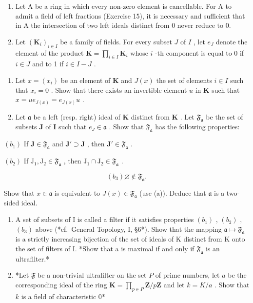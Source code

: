 \begin{enumerate}
\def\labelenumi{\arabic{enumi}.}
\setcounter{enumi}{15}
\item
  Let A be a ring in which every non-zero element is cancellable. For A to admit a field of left fractions (Exercise 15), it is necessary and sufficient that in A the intersection of two left ideals distinct from 0 never reduce to 0.
\item
  Let \((\mathbf{K}_i)_{i\in I}\) be a family of fields. For every subset \(J\) of \(I\) , let \(e_J\) denote the element of the product \(\mathbf{K} = \prod_{i\in I}\mathbf{K}_i\) whose \(i\) -th component is equal to 0 if \(i\in J\) and to 1 if \(i\in I - J\) .
\end{enumerate}

\begin{enumerate}
\def\labelenumi{(\alph{enumi})}
\item
  Let \(x = (x_{i})\) be an element of \(\mathbf{K}\) and \(J(x)\) the set of elements \(i \in I\) such that \(x_{i} = 0\) . Show that there exists an invertible element \(u\) in \(\mathbf{K}\) such that \(x = ue_{J(x)} = e_{J(x)}u\) .
\item
  Let \(\mathfrak{a}\) be a left (resp. right) ideal of \(\mathbf{K}\) distinct from \(\mathbf{K}\) . Let \(\mathfrak{F}_{\mathfrak{a}}\) be the set of subsets \(\mathbf{J}\) of \(\mathbf{I}\) such that \(e_{J} \in \mathfrak{a}\) . Show that \(\mathfrak{F}_{\mathfrak{a}}\) has the following properties:
\end{enumerate}

\((b_{1})\) If \(\mathbf{J} \in \mathfrak{F}_{\mathfrak{a}}\) and \(\mathbf{J}' \supset \mathbf{J}\) , then \(\mathbf{J}' \in \mathfrak{F}_{\mathfrak{a}}\) .

\((b_{2})\) If \(\mathrm{J}_1, \mathrm{J}_2 \in \mathfrak{F}_{\mathfrak{a}}\) , then \(\mathrm{J}_1 \cap \mathrm{J}_2 \in \mathfrak{F}_{\mathfrak{a}}\) .

\[
\left(b _ {3}\right) \varnothing \notin \mathfrak {F} _ {\mathfrak {a}}.
\]

Show that \(x \in \mathfrak{a}\) is equivalent to \(J(x) \in \mathfrak{F}_{\mathfrak{a}}\) (use (a)). Deduce that \(\mathfrak{a}\) is a two-sided ideal.

\begin{enumerate}
\def\labelenumi{(\alph{enumi})}
\setcounter{enumi}{2}
\item
  A set of subsets of I is called a filter if it satisfies properties \((b_{1})\) , \((b_{2})\) , \((b_{3})\) above (*cf.~General Topology, I, §6*). Show that the mapping \(\mathfrak{a} \mapsto \mathfrak{F}_{\mathfrak{a}}\) is a strictly increasing bijection of the set of ideals of K distinct from K onto the set of filters of I. *Show that a is maximal if and only if \(\mathfrak{F}_{\mathfrak{a}}\) is an ultrafilter.*
\item
  *Let \(\mathfrak{F}\) be a non-trivial ultrafilter on the set \(P\) of prime numbers, let \(a\) be the corresponding ideal of the ring \(\mathbf{K} = \prod_{p \in P} \mathbf{Z}/p\mathbf{Z}\) and let \(k = K/a\) . Show that \(k\) is a field of characteristic \(0\)*
\end{enumerate}

